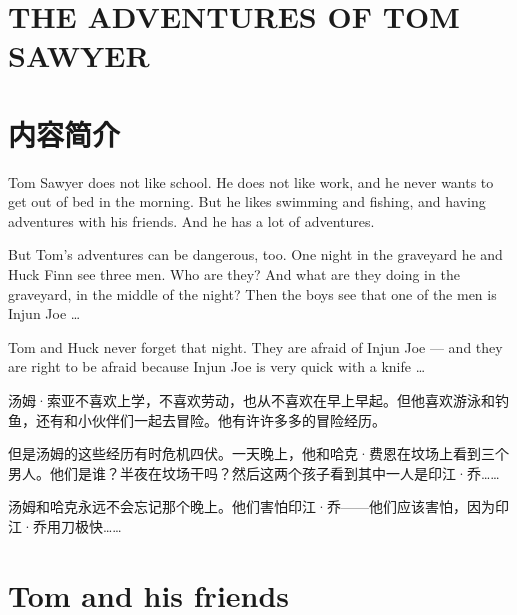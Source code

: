 \documentclass[fontset=ubuntu, zihao=5]{ctexart}
\makeatletter
\newlength{\drop}%
\def\subtitle#1{\gdef\@subtitle{#1}}
\def\@subtitle{\@latex@warning{No \noexpand\subtitle given}}
\def\maketitle{%
  \thispagestyle{empty}
  \null
  \begingroup
  \drop = 0.2\textheight
  \centering
  \vspace*{0.6\drop}
  {\Huge \bfseries \@title}\\[2\baselineskip]
  {\huge \bfseries \itshape \@subtitle}\\[3\baselineskip]

  \vspace*{0.8\drop}
  {
    \centering
    \Large
    \begin{tblr}{colspec={cc}}
      编\qquad 者： &  \@author \\
      日\qquad 期： & \@date \\
    \end{tblr}

    \vspace*{0.1\drop}
    \url{https://github.com/sd44/old-man-and-sea}

    \vspace*{0.5\drop}
    \kaishu{此书献给子墨、子韩和freemdict.com}
  }
  \vspace*{0.5\drop}

  \endgroup
  \vfill\null
  \clearpage

  \begingroup
  \thispagestyle{empty}
  \null
  \newpage
  \endgroup
}
\makeatother
\begin{document}

\tableofcontents


\begin{paracol}{2}

\section*{THE ADVENTURES OF TOM SAWYER}

\switchcolumn

\section*{内容简介}

\switchcolumn*

Tom Sawyer does not like school. He does not like work, and he never wants to get out of bed in the morning. But he likes swimming and fishing, and having adventures with his friends. And he has a lot of adventures.


But Tom's adventures can be dangerous, too. One night in the graveyard he and Huck Finn see three men. Who are they? And what are they doing in the graveyard, in the middle of the night? Then the boys see that one of the men is Injun Joe \ldots{}


Tom and Huck never forget that night. They are afraid of Injun Joe — and they are right to be afraid because Injun Joe is very quick with a knife \ldots{}

\switchcolumn

汤姆·索亚不喜欢上学，不喜欢劳动，也从不喜欢在早上早起。但他喜欢游泳和钓鱼，还有和小伙伴们一起去冒险。他有许许多多的冒险经历。

但是汤姆的这些经历有时危机四伏。一天晚上，他和哈克·费恩在坟场上看到三个男人。他们是谁？半夜在坟场干吗？然后这两个孩子看到其中一人是印江·乔……

汤姆和哈克永远不会忘记那个晚上。他们害怕印江·乔——他们应该害怕，因为印江·乔用刀极快……

\switchcolumn*

\section{Tom and his friends}


\end{paracol}
\end{document}
